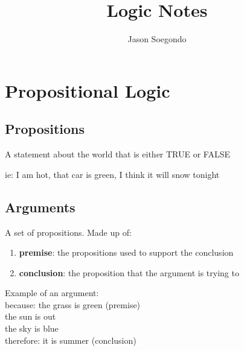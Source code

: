 \documentclass[]{article}
\title{Logic Notes}
\author{Jason Soegondo}
\begin{document}
\maketitle

\tableofcontents

\begin{abstract}
\end{abstract}

\section{Propositional Logic}
\subsection{Propositions}
A statement about the world that is either TRUE or FALSE

ie: I am hot, that car is green, I think it will snow tonight 
\subsection{Arguments}
A set of propositions. Made up of:
\begin{enumerate}
	\item{\textbf{premise}: the propositions used to support the conclusion}
	\item{\textbf{conclusion}: the proposition that the argument is trying to}
\end{enumerate}
Example of an argument:\\
because: the grass is green (premise)\\
the sun is out\\
the sky is blue\\
therefore: it is summer (conclusion)
\end{document}
